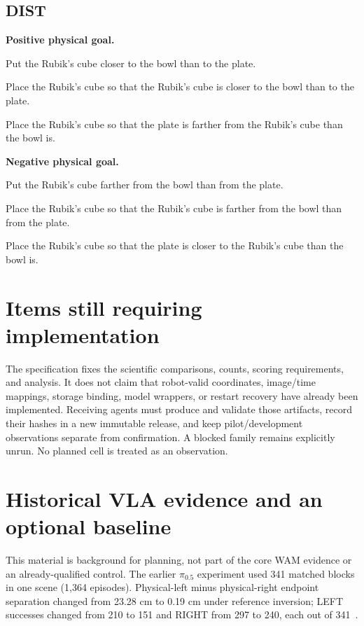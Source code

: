 \documentclass[11pt]{article}
\begin{document}
\subsection*{DIST}
\textbf{Positive physical goal.}\par
\begin{description}[font=\normalfont\bfseries]
\item[D] Put the Rubik's cube closer to the bowl than to the plate.
\item[C] Place the Rubik's cube so that the Rubik's cube is closer to the bowl than to the plate.
\item[I] Place the Rubik's cube so that the plate is farther from the Rubik's cube than the bowl is.
\end{description}
\textbf{Negative physical goal.}\par
\begin{description}[font=\normalfont\bfseries]
\item[D] Put the Rubik's cube farther from the bowl than from the plate.
\item[C] Place the Rubik's cube so that the Rubik's cube is farther from the bowl than from the plate.
\item[I] Place the Rubik's cube so that the plate is closer to the Rubik's cube than the bowl is.
\end{description}

\section{Items still requiring implementation}
The specification fixes the scientific comparisons, counts, scoring requirements, and analysis. It does not claim that robot-valid coordinates, image/time mappings, storage binding, model wrappers, or restart recovery have already been implemented. Receiving agents must produce and validate those artifacts, record their hashes in a new immutable release, and keep pilot/development observations separate from confirmation. A blocked family remains explicitly unrun. No planned cell is treated as an observation.

\section{Historical VLA evidence and an optional baseline}\label{app:pi05}
This material is background for planning, not part of the core WAM evidence or an already-qualified control. The earlier $\pi_{0.5}$ experiment used 341 matched blocks in one scene (1,364 episodes). Physical-left minus physical-right endpoint separation changed from 23.28 cm to 0.19 cm under reference inversion; LEFT successes changed from 210 to 151 and RIGHT from 297 to 240, each out of 341~\cite{archive,oldpaper}.
\end{document}
